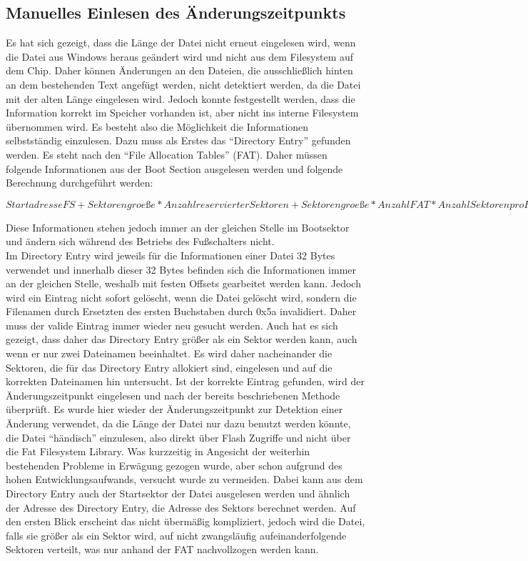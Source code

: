 \subsection{Manuelles Einlesen des Änderungszeitpunkts}
Es hat sich gezeigt, dass die Länge der Datei nicht erneut eingelesen wird, wenn die Datei aus Windows heraus geändert wird und nicht aus dem Filesystem auf dem Chip. Daher können Änderungen an den Dateien, die ausschließlich hinten an dem bestehenden Text angefügt werden, nicht detektiert werden, da die Datei mit der alten Länge eingelesen wird. Jedoch konnte festgestellt werden, dass die Information korrekt im Speicher vorhanden ist, aber nicht ins interne Filesystem übernommen wird. Es besteht also die Möglichkeit die Informationen selbstständig einzulesen. Dazu muss als Erstes das ``Directory Entry'' gefunden werden. Es steht nach den ``File Allocation Tables'' (FAT). Daher müssen folgende Informationen aus der Boot Section ausgelesen werden und folgende Berechnung durchgeführt werden: 

\(Startadresse FS + Sektorengroeße*Anzahl reservierter Sektoren + Sektorengroeße*Anzahl FAT*Anzahl Sektoren pro FAT = Startadresse FS + Sektorengröße * (Anzahl reservierter Sektoren + Anzahl FAT*Anzahl Sektoren pro FAT)\)

Diese Informationen stehen jedoch immer an der gleichen Stelle im Bootsektor und ändern sich während des Betriebs des Fußschalters nicht. \\
Im Directory Entry wird jeweils für die Informationen einer Datei 32 Bytes verwendet und innerhalb dieser 32 Bytes befinden sich die Informationen immer an der gleichen Stelle, weshalb mit festen Offsets gearbeitet werden kann. Jedoch wird ein Eintrag nicht sofort gelöscht, wenn die Datei gelöscht wird, sondern die Filenamen durch Ersetzten des ersten Buchstaben durch 0x5a invalidiert. Daher muss der valide Eintrag immer wieder neu gesucht werden. Auch hat es sich gezeigt, dass daher das Directory Entry größer als ein Sektor werden kann, auch wenn er nur zwei Dateinamen beeinhaltet. Es wird daher nacheinander die Sektoren, die für das Directory Entry allokiert sind, eingelesen und auf die korrekten Dateinamen hin untersucht. Ist der korrekte Eintrag gefunden, wird der Änderungszeitpunkt eingelesen und nach der bereits beschriebenen Methode überprüft. Es wurde hier wieder der Änderungszeitpunkt zur Detektion einer Änderung verwendet, da die Länge der Datei nur dazu benutzt werden könnte, die Datei ``händisch'' einzulesen, also direkt über Flash Zugriffe und nicht über die Fat Filesystem Library. Was kurzzeitig in Angesicht der weiterhin bestehenden Probleme in Erwägung gezogen wurde, aber schon aufgrund des hohen Entwicklungsaufwands, versucht wurde zu vermeiden. Dabei kann aus dem Directory Entry auch der Startsektor der Datei ausgelesen werden und ähnlich der Adresse des Directory Entry, die Adresse des Sektors berechnet werden. Auf den ersten Blick erscheint das nicht übermäßig kompliziert, jedoch wird die Datei, falls sie größer als ein Sektor wird, auf nicht zwangsläufig aufeinanderfolgende Sektoren verteilt, was nur anhand der FAT nachvollzogen werden kann.

